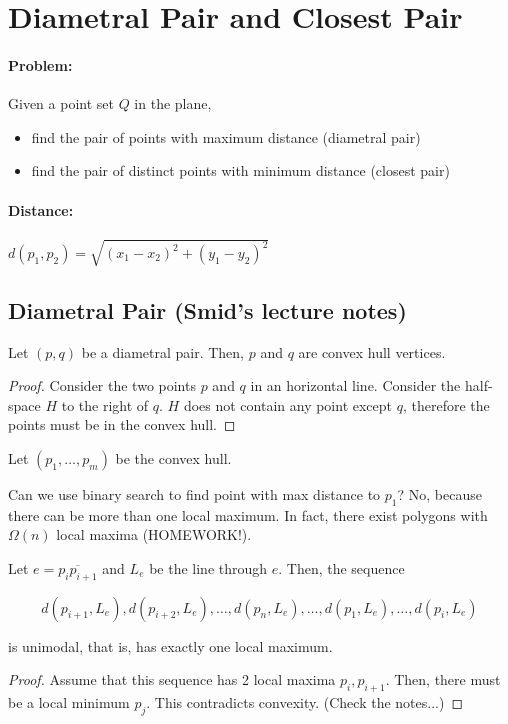 \section{Diametral Pair and Closest Pair}

\paragraph{Problem:} Given a point set $Q$ in the plane,
\begin{itemize}
\item find the pair of points with maximum distance (diametral pair)
\item find the pair of distinct points with minimum distance (closest pair)	
\end{itemize}

\paragraph{Distance: } $d(p_1, p_2) = \sqrt{(x_1 - x_2)^2 + (y_1 - y_2)^2}$

\subsection{Diametral Pair (Smid's lecture notes)}

\begin{mylemma}
Let $(p,q)$ be a diametral pair. Then, $p$ and $q$ are convex hull vertices.	
\end{mylemma}
\begin{proof}
	Consider the two points $p$ and $q$ in an horizontal line. Consider the half-space $H$ to the right of $q$. $H$ does not contain any point except $q$, therefore the points must be in the convex hull.
\end{proof}

Let $(p_1, \ldots, p_m)$ be the convex hull.

Can we use binary search to find point with max distance to $p_1$? No, because there can be more than one local maximum. In fact, there exist polygons with $\Omega(n)$ local maxima (HOMEWORK!).

\begin{mylemma}
Let $e = \overline{p_i p_{i+1}}$ and $L_e$ be the line through $e$. Then, the sequence

$$d(p_{i+1}, L_e), d(p_{i+2}, L_e), \ldots, d(p_n, L_e), \ldots, d(p_{1}, L_e), \ldots, d(p_{i}, L_e)$$

is unimodal, that is, has exactly one local maximum.
\end{mylemma}
\begin{proof}
	Assume that this sequence has 2 local maxima $p_i, p_{i+1}$. Then, there must be a local minimum $p_j$. This contradicts convexity. (Check the notes...)
\end{proof}


